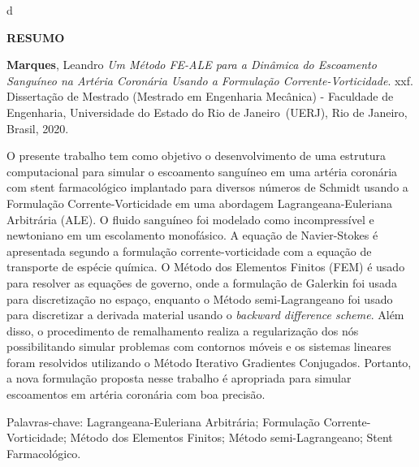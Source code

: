 d\begin{center}
\textbf{RESUMO}
\end{center}


$\!$\\

\hspace{-1.3cm}\textbf{Marques}, Leandro \textit{Um Método FE-ALE para a Dinâmica do Escoamento Sanguíneo na Artéria Coronária Usando a Formulação Corrente-Vorticidade}. xxf. Dissertação de Mestrado (Mestrado em Engenharia Mecânica) - Faculdade de Engenharia, Universidade do Estado do Rio de Janeiro~(UERJ), Rio de Janeiro, Brasil, 2020.

\vspace{.2cm}

\indent 
O presente trabalho tem como objetivo o desenvolvimento 
de uma estrutura computacional para simular o escoamento 
sanguíneo em uma artéria coronária com stent farmacológico 
implantado para diversos números de Schmidt usando a Formulação Corrente-Vorticidade em uma 
abordagem Lagrangeana-Euleriana Arbitrária (ALE).
O fluido sanguíneo foi modelado como incompressível e newtoniano em um escolamento monofásico.
A equação de Navier-Stokes é apresentada segundo a formulação 
corrente-vorticidade com a equação de transporte de espécie química.
O Método dos Elementos Finitos (FEM) é usado para resolver as equações 
de governo, onde a formulação de Galerkin foi usada para 
discretização no espaço, enquanto o Método semi-Lagrangeano 
foi usado para discretizar a derivada material usando 
o \textit{backward difference scheme}. 
Além disso, o procedimento de remalhamento
realiza a regularização dos nós possibilitando
simular problemas com contornos móveis e os sistemas lineares foram resolvidos utilizando o 
Método Iterativo Gradientes Conjugados.
Portanto, a nova formulação proposta
nesse trabalho é apropriada para
simular escoamentos em artéria coronária com boa precisão.

\vspace{1cm}

\hspace{-1.3cm}Palavras-chave: Lagrangeana-Euleriana Arbitrária; Formulação Corrente-Vorticidade; Método dos Elementos Finitos; Método semi-Lagrangeano; Stent Farmacológico.
